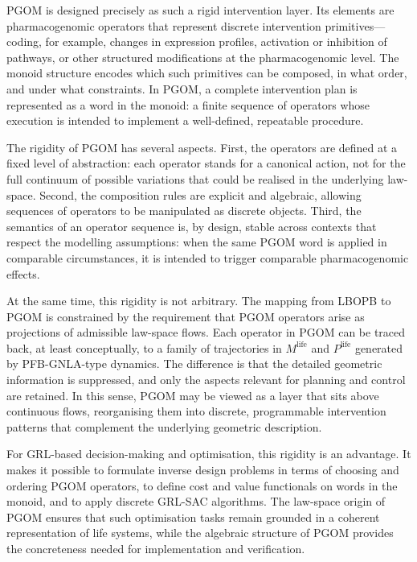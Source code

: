 \documentclass[11pt]{book}
\theoremstyle{plain}
\theoremstyle{definition}
\theoremstyle{remark}
\begin{document}
PGOM is designed precisely as such a rigid intervention layer. Its
elements are pharmacogenomic operators that represent discrete
intervention primitives—coding, for example, changes in expression
profiles, activation or inhibition of pathways, or other structured
modifications at the pharmacogenomic level. The monoid structure
encodes which such primitives can be composed, in what order, and under
what constraints. In PGOM, a complete intervention plan is represented
as a word in the monoid: a finite sequence of operators whose execution
is intended to implement a well-defined, repeatable procedure.

The rigidity of PGOM has several aspects. First, the operators are
defined at a fixed level of abstraction: each operator stands for a
canonical action, not for the full continuum of possible variations
that could be realised in the underlying law-space. Second, the
composition rules are explicit and algebraic, allowing sequences of
operators to be manipulated as discrete objects. Third, the semantics
of an operator sequence is, by design, stable across contexts that
respect the modelling assumptions: when the same PGOM word is applied
in comparable circumstances, it is intended to trigger comparable
pharmacogenomic effects.

At the same time, this rigidity is not arbitrary. The mapping from LBOPB
to PGOM is constrained by the requirement that PGOM operators arise as
projections of admissible law-space flows. Each operator in PGOM can be
traced back, at least conceptually, to a family of trajectories in
$M^{\mathrm{life}}$ and $P^{\mathrm{life}}$ generated by PFB-GNLA-type
dynamics. The difference is that the detailed geometric information is
suppressed, and only the aspects relevant for planning and control are
retained. In this sense, PGOM may be viewed as a layer that sits above
continuous flows, reorganising them into discrete, programmable
intervention patterns that complement the underlying geometric
description.

For GRL-based decision-making and optimisation, this rigidity is an
advantage. It makes it possible to formulate inverse design problems in
terms of choosing and ordering PGOM operators, to define cost and value
functionals on words in the monoid, and to apply discrete GRL-SAC
algorithms. The law-space origin of PGOM ensures that such optimisation
tasks remain grounded in a coherent representation of life systems,
while the algebraic structure of PGOM provides the concreteness needed
for implementation and verification.
\end{document}
